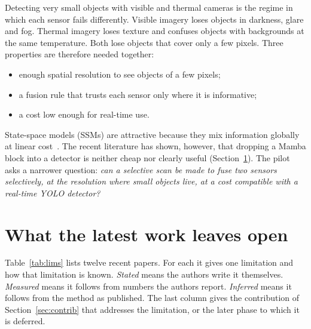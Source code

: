 \documentclass[11pt,a4paper]{article}
\begin{document}
Detecting very small objects with visible and thermal cameras is the regime in which
each sensor fails differently. Visible imagery loses objects in darkness, glare and
fog. Thermal imagery loses texture and confuses objects with backgrounds at the same
temperature. Both lose objects that cover only a few pixels. Three properties are
therefore needed together:
\begin{itemize}
  \item enough spatial resolution to see objects of a few pixels;
  \item a fusion rule that trusts each sensor only where it is informative;
  \item a cost low enough for real-time use.
\end{itemize}
State-space models (SSMs) are attractive because they mix information globally at
linear cost~\citep{gu2023mamba,liu2024vmamba}. The recent literature has shown,
however, that dropping a Mamba block into a detector is neither cheap nor clearly
useful (Section~\ref{sec:lims}). The pilot asks a narrower question: \emph{can a
selective scan be made to fuse two sensors selectively, at the resolution where small
objects live, at a cost compatible with a real-time YOLO detector?}

\section{What the latest work leaves open}
\label{sec:lims}

Table~\ref{tab:lims} lists twelve recent papers. For each it gives one limitation and
how that limitation is known. \emph{Stated} means the authors write it themselves.
\emph{Measured} means it follows from numbers the authors report. \emph{Inferred}
means it follows from the method as published. The last column gives the
contribution of Section~\ref{sec:contrib} that addresses the limitation, or the later
phase to which it is deferred.
\end{document}
